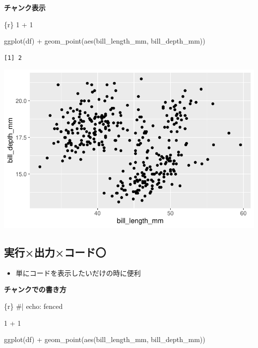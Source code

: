 \documentclass[
  b5paper,
  xelatex, ja=standard]{bxjsbook}
\newenvironment{Shaded}{\begin{snugshade}}{\end{snugshade}}
\newcommand{\InformationTok}[1]{\textcolor[rgb]{0.37,0.37,0.37}{#1}}
\providecommand{\tightlist}{%
  \setlength{\itemsep}{0pt}\setlength{\parskip}{0pt}}\usepackage{longtable,booktabs,array}
\begin{document}
\textbf{チャンク表示}

\begin{Shaded}
\begin{Highlighting}[]
\InformationTok{\textasciigrave{}\textasciigrave{}\textasciigrave{}\{r\}}
\InformationTok{1 + 1}


\InformationTok{ggplot(df) +}
\InformationTok{  geom\_point(aes(bill\_length\_mm, bill\_depth\_mm))}
\InformationTok{\textasciigrave{}\textasciigrave{}\textasciigrave{}}
\end{Highlighting}
\end{Shaded}

\begin{verbatim}
[1] 2
\end{verbatim}

\includegraphics{basic_files/figure-pdf/unnamed-chunk-9-1.pdf}

\subsection{実行×\textbar 出力×\textbar コード〇}

\begin{itemize}
\tightlist
\item
  単にコードを表示したいだけの時に便利
\end{itemize}

\textbf{チャンクでの書き方}

\begin{Shaded}
\begin{Highlighting}[]
\InformationTok{\textasciigrave{}\textasciigrave{}\textasciigrave{}\{r\}}
\InformationTok{\#| echo: fenced}

\InformationTok{1 + 1}


\InformationTok{ggplot(df) +}
\InformationTok{  geom\_point(aes(bill\_length\_mm, bill\_depth\_mm))}
\InformationTok{\textasciigrave{}\textasciigrave{}\textasciigrave{}}
\end{Highlighting}
\end{Shaded}
\end{document}
